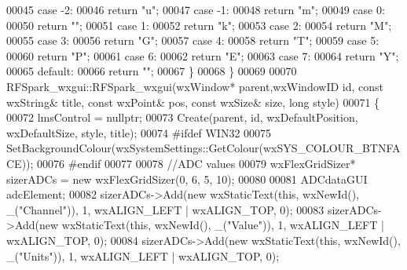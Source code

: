 \begin{DoxyCode}
00045     \textcolor{keywordflow}{case} -2:
00046         \textcolor{keywordflow}{return} \textcolor{stringliteral}{"u"};
00047     \textcolor{keywordflow}{case} -1:
00048         \textcolor{keywordflow}{return} \textcolor{stringliteral}{"m"};
00049     \textcolor{keywordflow}{case} 0:
00050         \textcolor{keywordflow}{return} \textcolor{stringliteral}{""};
00051     \textcolor{keywordflow}{case} 1:
00052         \textcolor{keywordflow}{return} \textcolor{stringliteral}{"k"};
00053     \textcolor{keywordflow}{case} 2:
00054         \textcolor{keywordflow}{return} \textcolor{stringliteral}{"M"};
00055     \textcolor{keywordflow}{case} 3:
00056         \textcolor{keywordflow}{return} \textcolor{stringliteral}{"G"};
00057     \textcolor{keywordflow}{case} 4:
00058         \textcolor{keywordflow}{return} \textcolor{stringliteral}{"T"};
00059     \textcolor{keywordflow}{case} 5:
00060         \textcolor{keywordflow}{return} \textcolor{stringliteral}{"P"};
00061     \textcolor{keywordflow}{case} 6:
00062         \textcolor{keywordflow}{return} \textcolor{stringliteral}{"E"};
00063     \textcolor{keywordflow}{case} 7:
00064         \textcolor{keywordflow}{return} \textcolor{stringliteral}{"Y"};
00065     \textcolor{keywordflow}{default}:
00066         \textcolor{keywordflow}{return} \textcolor{stringliteral}{""};
00067     \}
00068 \}
00069 
00070 RFSpark_wxgui::RFSpark_wxgui(wxWindow* parent,wxWindowID \textcolor{keywordtype}{id}, \textcolor{keyword}{const} wxString& title, \textcolor{keyword}{const} wxPoint& pos,\textcolor{keyword}{
      const} wxSize& size, \textcolor{keywordtype}{long} style)
00071 \{
00072     lmsControl = \textcolor{keyword}{nullptr};
00073     Create(parent, \textcolor{keywordtype}{id}, wxDefaultPosition, wxDefaultSize, style, title);
00074 \textcolor{preprocessor}{#ifdef WIN32}
00075     SetBackgroundColour(wxSystemSettings::GetColour(wxSYS\_COLOUR\_BTNFACE));
00076 \textcolor{preprocessor}{#endif}
00077 
00078     \textcolor{comment}{//ADC values}
00079     wxFlexGridSizer* sizerADCs = \textcolor{keyword}{new} wxFlexGridSizer(0, 6, 5, 10);
00080 
00081     ADCdataGUI adcElement;
00082     sizerADCs->Add(\textcolor{keyword}{new} wxStaticText(\textcolor{keyword}{this}, wxNewId(), \_(\textcolor{stringliteral}{"Channel"})), 1, wxALIGN\_LEFT | wxALIGN\_TOP, 0);
00083     sizerADCs->Add(\textcolor{keyword}{new} wxStaticText(\textcolor{keyword}{this}, wxNewId(), \_(\textcolor{stringliteral}{"Value"})), 1, wxALIGN\_LEFT | wxALIGN\_TOP, 0);
00084     sizerADCs->Add(\textcolor{keyword}{new} wxStaticText(\textcolor{keyword}{this}, wxNewId(), \_(\textcolor{stringliteral}{"Units"})), 1, wxALIGN\_LEFT | wxALIGN\_TOP, 0);

\end{DoxyCode}
